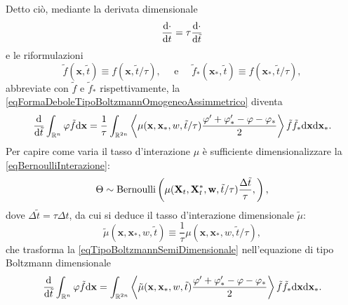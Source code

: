         Detto ciò, mediante la derivata dimensionale
        \begin{equation*}
          \frac{\mathrm{d}\cdot}{\mathrm{d}t}=\tau\frac{\mathrm{d}\cdot}{\mathrm{d}\tilde t}
        \end{equation*}
        e le riformulazioni
        \begin{equation*}
          \tilde f(\mathbf x,\tilde t)\equiv f(\mathbf x,\tilde t/\tau),
          \quad\text{ e }\quad
          \tilde f_*(\mathbf x_*,\tilde t)\equiv f(\mathbf x_*,\tilde t/\tau),
        \end{equation*}
        abbreviate con \(\tilde f\) e \(\tilde f_*\) rispettivamente, la \ref{eqFormaDeboleTipoBoltzmannOmogeneoAssimmetrico} diventa
        \begin{equation}
          \label{eqTipoBoltzmannSemiDimensionale}
          \frac{\mathrm{d}}{\mathrm{d}\tilde t}\int_{\mathbb R^n}\varphi\tilde f\mathrm{d}\mathbf x=
          \frac1\tau\int_{\mathbb R^{2n}}\left\langle
            \mu(\mathbf x,\mathbf x_*,w,\tilde t/\tau)
              \frac{\varphi'+\varphi'_*-\varphi-\varphi_*}2
            \right\rangle
          \tilde f\tilde f_*\mathrm{d}\mathbf x\mathrm{d}\mathbf x_*.
        \end{equation}
        Per capire come varia il tasso d'interazione \(\mu\) è sufficiente dimensionalizzare la \ref{eqBernoulliInterazione}:
        \begin{equation*}
          \Theta\sim\operatorname{Bernoulli}\left(
            \mu(\mathbf X_t,\mathbf X^*_t,\mathbf w,\tilde t/\tau)\frac{\Delta\tilde t}\tau,
          \right),
        \end{equation*}
        dove \(\Delta\tilde t=\tau\Delta t\), da cui si deduce il tasso d'interazione dimensionale \(\tilde\mu\):
        \begin{equation*}
          \tilde\mu(\mathbf x,\mathbf x_*,w,\tilde t)
          \equiv\frac1\tau\mu(\mathbf x,\mathbf x_*,w,\tilde t/\tau),
        \end{equation*}
        che trasforma la \cref{eqTipoBoltzmannSemiDimensionale} nell'equazione di tipo Boltzmann dimensionale
        \begin{equation}
          \label{eqTipoBoltzmannDimensionale}
          \frac{\mathrm{d}}{\mathrm{d}\tilde t}\int_{\mathbb R^n}\varphi\tilde f\mathrm{d}\mathbf x=
          \int_{\mathbb R^{2n}}\left\langle
            \tilde\mu(\mathbf x,\mathbf x_*,w,\tilde t)
              \frac{\varphi'+\varphi'_*-\varphi-\varphi_*}2
            \right\rangle
          \tilde f\tilde f_*\mathrm{d}\mathbf x\mathrm{d}\mathbf x_*.
        \end{equation}

